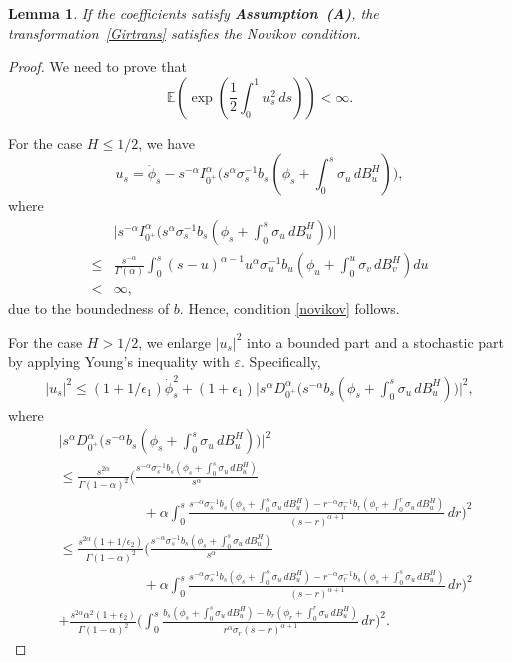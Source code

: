\documentclass[preprint,12pt]{elsarticle}
\newtheorem{lemma}[theorem]{Lemma}
\theoremstyle{definition}  %
\theoremstyle{plain}  %
\begin{document}
\begin{lemma} 
	If the coefficients satisfy \textbf{Assumption~(A)}, 
the transformation~\eqref{Girtrans} satisfies the Novikov condition.
\end{lemma}
\begin{proof}
	We need to prove that 
    \begin{equation}
        \mathbb{E}\!\left(\exp\!\left(\frac{1}{2}\int_0^1 u_s^2 \, ds\right)\right) < \infty. \label{novikov}
    \end{equation}

	For the case $H \leq  1/2$, we have
	\[
	 u_s = \dot{\phi}_s- s^{-\alpha} I_{0^+}^\alpha  \big(s^\alpha \sigma_s^{-1}b_s(\phi_s+\int_0^s \sigma_u \, dB^H_u)\big),
	\]
    where 
    \begin{align*}
        &\big|s^{-\alpha}I_{0^+}^\alpha  \big(s^\alpha \sigma_s^{-1}b_s(\phi_s+\int_0^s \sigma_u \, dB^H_u)\big)\big|\\
        \leq & \frac{s^{-\alpha}}{\Gamma(\alpha)} \int_0^s (s-u)^{\alpha-1}u^\alpha \sigma_u^{-1}b_u\!\left(\phi_u+\int_0^u \sigma_v \, dB^H_v\right) du\\
        <& \infty,
    \end{align*}
    due to the boundedness of $b$. Hence, condition \eqref{novikov} follows. 
   
    For the case $H>1/2$, we enlarge $|u_s|^2$ into a bounded part and a stochastic part 
by applying Young's inequality with $\varepsilon$. Specifically,
    \begin{align*}
        |u_s|^2 \leq (1+1/\epsilon_1)\dot{\phi}_s^2+(1+\epsilon_1)\Big|s^\alpha D^{\alpha}_{0^+}\big(s^{-\alpha} b_s(\phi_s+\int_0^s \sigma_u \, dB^H_u)\big)\Big|^2,
    \end{align*}
where
    \begin{align*}
        &\Big|s^\alpha D^{\alpha}_{0^+}\big(s^{-\alpha} b_s(\phi_s+\int_0^s \sigma_u \, dB^H_u)\big)\Big|^2 \\
        &\leq \frac{s^{2\alpha}}{\Gamma(1-\alpha)^2}\Bigg(\frac{ s^{-\alpha} \sigma_s^{-1} b_s(\phi_s+\int_0^s \sigma_u \, dB^H_u)}{s^\alpha}\\
        &\qquad\qquad\qquad+\alpha\int_0^s \frac{ s^{-\alpha} \sigma_s^{-1} b_s(\phi_s+\int_0^s \sigma_u \, dB^H_u)- r^{-\alpha} \sigma_r^{-1} b_r(\phi_r+\int_0^r \sigma_u \, dB^H_u)}{(s-r)^{\alpha+1}} \, dr   \Bigg)^2\\
        &\leq  \frac{s^{2\alpha}(1+1/\epsilon_2)}{\Gamma(1-\alpha)^2}\Bigg(\frac{ s^{-\alpha} \sigma_s^{-1} b_s(\phi_s+\int_0^s \sigma_u \, dB^H_u)}{s^\alpha}\\
        &\qquad\qquad\qquad+\alpha\int_0^s \frac{ s^{-\alpha} \sigma_s^{-1} b_s(\phi_s+\int_0^s \sigma_u \, dB^H_u)- r^{-\alpha} \sigma_r^{-1} b_s(\phi_s+\int_0^s \sigma_u \, dB^H_u)}{(s-r)^{\alpha+1}} \, dr \Bigg)^2\\
        & +\frac{s^{2\alpha}\alpha^2(1+\epsilon_2)}{\Gamma(1-\alpha)^2}\Bigg(\int_0^s \frac{ b_s(\phi_s+\int_0^s \sigma_u \, dB^H_u)-  b_r(\phi_r+\int_0^r \sigma_u \, dB^H_u)}{r^{\alpha} \sigma_r(s-r)^{\alpha+1}} \, dr \Bigg)^2.
    \end{align*}


\end{proof}
\end{document}
